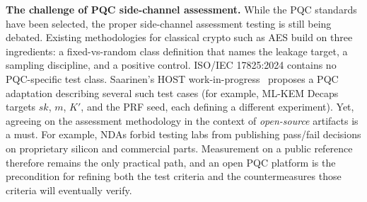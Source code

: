\documentclass[10pt,conference]{IEEEtran}
\newcommand{\mlkem}{ML-KEM-1024\xspace}
\newcommand{\mldsa}{ML-DSA-44\xspace}
\begin{document}



\textbf{The challenge of PQC side-channel assessment.} While the PQC standards have been selected, the proper side-channel assessment testing is still being debated. Existing methodologies for classical crypto such as AES build on three ingredients: a fixed-vs-random class definition that names the leakage target, a sampling discipline, and a positive control. ISO/IEC 17825:2024 contains no PQC-specific test class. Saarinen's HOST work-in-progress~\cite{saarinen} proposes a PQC adaptation describing several such test cases (for example, ML-KEM Decaps targets $\mathit{sk}$, $m$, $K'$, and the PRF seed, each defining a different experiment).
Yet, agreeing on the assessment methodology in the context of {\em open-source} artifacts is a must. For example, NDAs forbid testing labs from publishing pass/fail decisions on proprietary silicon and commercial parts. Measurement on a public reference therefore remains the only practical path, and an open PQC platform is the precondition for refining both the test criteria and the countermeasures those criteria will eventually verify.
\end{document}
